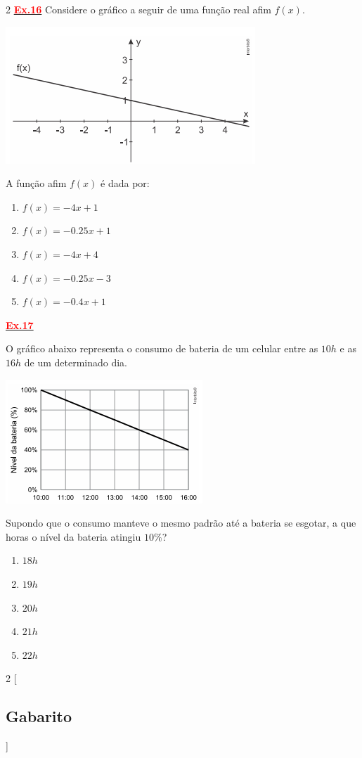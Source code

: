 \documentclass[12pt]{report}
\newcommand{\ex}[1]{\hypertarget{ex#1}{\noindent\hyperlink{gab#1}{\textcolor{red}{\textbf{Ex.#1}}}}}
\newenvironment{Figure}
  {\par\medskip\noindent\minipage{\linewidth}}
  {\endminipage\par\medskip}
\begin{document}
\begin{multicols}{2}
\ex{16} Considere o gráfico a seguir de uma função real afim $f(x)$.
\begin{Figure}
 \centering
 \includegraphics[scale=0.7]{figures/q11.png}
\end{Figure}
A função afim $f(x)$ é dada por:
\begin{enumerate}[label=\alph*)]
	\item $f(x) = -4x+1$
	\item $f(x) = -0.25x+1$
	\item $f(x) = -4x+4$
	\item $f(x) = -0.25x-3$
	\item $f(x) = -0.4x+1$
\end{enumerate}

\ex{17} O gráfico abaixo representa o consumo de bateria de um celular entre as $10h$ e as $16h$ de um determinado dia.
\begin{Figure}
	\centering
	\includegraphics[scale=0.7]{figures/q12.png}
\end{Figure}
Supondo que o consumo manteve o mesmo padrão até a bateria se esgotar, a que horas o nível da bateria atingiu $10\%$?

\begin{enumerate}[label=\alph*)]
	\item $18h$
	\item $19h$
	\item $20h$
	\item $21h$
	\item $22h$
\end{enumerate}




\end{multicols}

\newpage
\begin{multicols}{2}
[
\begin{center}
\section*{Gabarito}
\end{center}
]

\end{multicols}
\end{document}
